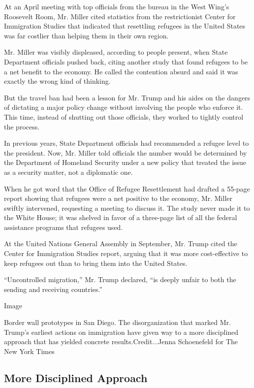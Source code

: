 At an April meeting with top officials from the bureau in the West
Wing's Roosevelt Room, Mr. Miller cited statistics from the
restrictionist Center for Immigration Studies that indicated that
resettling refugees in the United States was far costlier than helping
them in their own region.

Mr. Miller was visibly displeased, according to people present, when
State Department officials pushed back, citing another study that found
refugees to be a net benefit to the economy. He called the contention
absurd and said it was exactly the wrong kind of thinking.

But the travel ban had been a lesson for Mr. Trump and his aides on the
dangers of dictating a major policy change without involving the people
who enforce it. This time, instead of shutting out those officials, they
worked to tightly control the process.

In previous years, State Department officials had recommended a refugee
level to the president. Now, Mr. Miller told officials the number would
be determined by the Department of Homeland Security under a new policy
that treated the issue as a security matter, not a diplomatic one.

When he got word that the Office of Refugee Resettlement had drafted a
55-page report showing that refugees were a net positive to the economy,
Mr. Miller swiftly intervened, requesting a meeting to discuss it. The
study never made it to the White House; it was shelved in favor of a
three-page list of all the federal assistance programs that refugees
used.

At the United Nations General Assembly in September, Mr. Trump cited the
Center for Immigration Studies report, arguing that it was more
cost-effective to keep refugees out than to bring them into the United
States.

``Uncontrolled migration,'' Mr. Trump declared, ``is deeply unfair to
both the sending and receiving countries.''

Image

Border wall prototypes in San Diego. The disorganization that marked Mr.
Trump's earliest actions on immigration have given way to a more
disciplined approach that has yielded concrete results.Credit...Jenna
Schoenefeld for The New York Times

\hypertarget{more-disciplined-approach}{%
\subsection{More Disciplined Approach}\label{more-disciplined-approach}}

